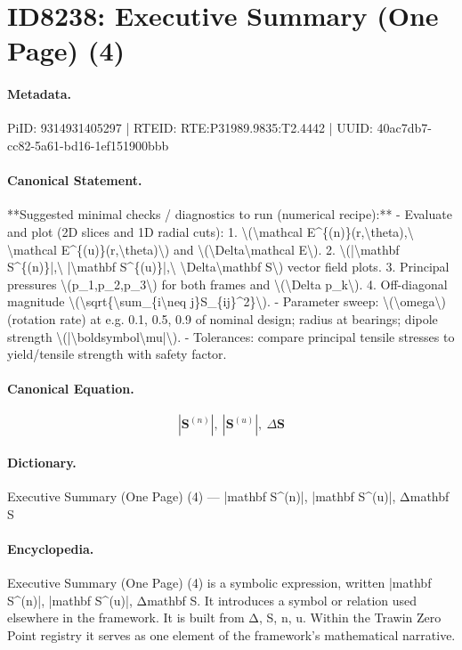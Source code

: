 \section*{ID8238: Executive Summary (One Page) (4)}
\paragraph{Metadata.}
PiID: 9314931405297 | RTEID: RTE:P31989.9835:T2.4442 | UUID: 40ac7db7-cc82-5a61-bd16-1ef151900bbb

\paragraph{Canonical Statement.}
**Suggested minimal checks / diagnostics to run (numerical recipe):** - Evaluate and plot (2D slices and 1D radial cuts): 1. \textbackslash{}(\textbackslash{}mathcal E\textasciicircum{}\{(n)\}(r,\textbackslash{}theta),\textbackslash{} \textbackslash{}mathcal E\textasciicircum{}\{(u)\}(r,\textbackslash{}theta)\textbackslash{}) and \textbackslash{}(\textbackslash{}Delta\textbackslash{}mathcal E\textbackslash{}). 2. \textbackslash{}(|\textbackslash{}mathbf S\textasciicircum{}\{(n)\}|,\textbackslash{} |\textbackslash{}mathbf S\textasciicircum{}\{(u)\}|,\textbackslash{} \textbackslash{}Delta\textbackslash{}mathbf S\textbackslash{}) vector field plots. 3. Principal pressures \textbackslash{}(p\_1,p\_2,p\_3\textbackslash{}) for both frames and \textbackslash{}(\textbackslash{}Delta p\_k\textbackslash{}). 4. Off-diagonal magnitude \textbackslash{}(\textbackslash{}sqrt\{\textbackslash{}sum\_\{i\textbackslash{}neq j\}S\_\{ij\}\textasciicircum{}2\}\textbackslash{}). - Parameter sweep: \textbackslash{}(\textbackslash{}omega\textbackslash{}) (rotation rate) at e.g. 0.1, 0.5, 0.9 of nominal design; radius at bearings; dipole strength \textbackslash{}(|\textbackslash{}boldsymbol\textbackslash{}mu|\textbackslash{}). - Tolerances: compare principal tensile stresses to yield/tensile strength with safety factor.

\paragraph{Canonical Equation.}
\[
|\mathbf S^{(n)}|,\ |\mathbf S^{(u)}|,\ \Delta\mathbf S
\]

\paragraph{Dictionary.}
Executive Summary (One Page) (4) — |mathbf S\textasciicircum{}(n)|, |mathbf S\textasciicircum{}(u)|, Δmathbf S

\paragraph{Encyclopedia.}
Executive Summary (One Page) (4) is a symbolic expression, written |mathbf S\textasciicircum{}(n)|, |mathbf S\textasciicircum{}(u)|, Δmathbf S. It introduces a symbol or relation used elsewhere in the framework. It is built from Δ, S, n, u. Within the Trawin Zero Point registry it serves as one element of the framework's mathematical narrative.

